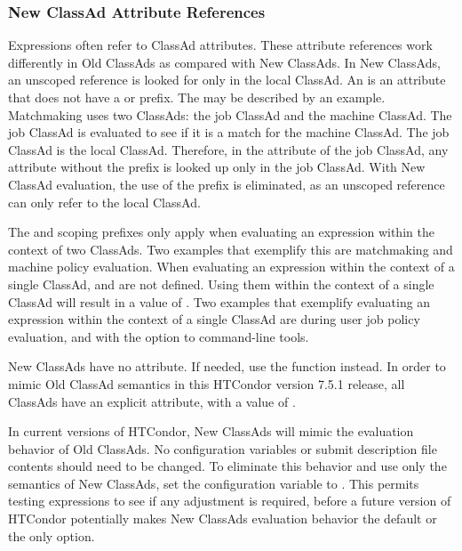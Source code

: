 \subsubsection{New ClassAd Attribute References}

Expressions often refer to ClassAd attributes.
These attribute references work differently in Old ClassAds as compared
with New ClassAds.
In New ClassAds, 
an unscoped reference is looked for only in the local ClassAd. 
An  is an attribute that does not have a
 or  prefix.
The  may be described by an example.
Matchmaking uses two ClassAds: the job ClassAd and the machine ClassAd. 
The job ClassAd is evaluated to see if it is a match for the machine ClassAd.
The job ClassAd is the local ClassAd.
Therefore, in the  attribute of the job ClassAd,
any attribute without the prefix  is looked up only
in the job ClassAd.
With New ClassAd evaluation, the use of the prefix  is eliminated,
as an unscoped reference can only refer to the local ClassAd.

The  and  scoping prefixes
only apply when evaluating an expression within the context of two ClassAds.
Two examples that exemplify this are matchmaking and machine policy evaluation.
When evaluating an expression within the context of a single ClassAd,
 and  are not defined.
Using them within the context of a single ClassAd will result
in a value of .
Two examples that exemplify evaluating an expression 
within the context of a single ClassAd are 
during user job policy evaluation,
and with the  option to command-line tools.

New ClassAds have no  attribute.
If needed, use the  function instead.
In order to mimic Old ClassAd semantics in this HTCondor version 7.5.1 release,
all ClassAds have an explicit  attribute,
with a value of .

In current versions of HTCondor, 
New ClassAds will mimic the evaluation behavior of Old ClassAds.
No configuration variables or submit description file contents should
need to be changed.
To eliminate this behavior and use only the semantics of New ClassAds, 
set the configuration variable
 to .
This permits testing expressions to see if any adjustment is required,
before a future version of HTCondor potentially makes New ClassAds
evaluation behavior the default or the only option. 

